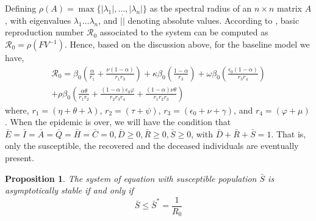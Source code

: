 \documentclass[fleqn,10pt]{wlscirep}
\newtheorem{proposition}{Proposition}
\begin{document}
%
%
Defining $\rho(A) = \max {\{ | \lambda_1 |, \ldots,  | \lambda_n |\} }$ as the spectral radius of an $n \times n$ matrix $A$, with eigenvalues $\lambda_1 \ldots \lambda_n$, and $|\dot|$ denoting absolute values. According to \cite{VANDENDRIESSCHE200229}, basic reproduction number $\mathcal{R}_0$ associated to the system can be computed as $\mathcal{R}_0 = \rho(FV^{-1})$. Hence, based on the discussion above, for the baseline model we have,
%
%
\begin{equation}
\begin{split}
\mathcal{R}_0 =  \beta_0 \left( \frac{\alpha}{r_1} + \frac{\nu \left(1-\alpha \right) }{r_1 r_3}\right) + \kappa \beta_0 \left( \frac{1-\alpha}{r_3} \right) + \omega \beta_0 \left( \frac{\epsilon_0 \left( 1-\alpha\right) }{r_3 r_4}\right) \\
+ \rho \beta_0 \left( \frac{\alpha \theta}{r_1 r_2} + \frac{\left( 1-\alpha\right) \epsilon_0 \varphi}{r_2 r_3 r_4} + \frac{\left( 1-\alpha\right) \nu \theta}{r_1 r_2 r_3}\right) 
\end{split}
\label{eqn:Rnot}
\end{equation}
%
%
where, $r_1 = \left( \eta + \theta + \lambda \right) $, $r_2 = \left( \tau + \psi \right) $, $r_3 = \left( \epsilon_0 + \nu + \gamma\right) $, and $r_4 =  \left( \varphi + \mu\right)$.
%
%
When the epidemic is over, we will have the condition that $\bar{E}=\bar{I}=\bar{A}=\bar{Q}=\bar{H}=\bar{C}=0,  \bar{D}\geq 0, \bar{R}\geq 0, \bar{S}\geq 0$, with $\bar{D} + \bar{R} + \bar{S} = 1$. That is, only the susceptible, the recovered and the deceased individuals are eventually present.
%
%
\begin{proposition}
The system of equation with susceptible population $\bar{S}$ is asymptotically stable if and only if
\begin{equation}
\bar{S} \leq \bar{S}^* = \frac{1}{R_0}
\end{equation}
\end{proposition}
\end{document}

